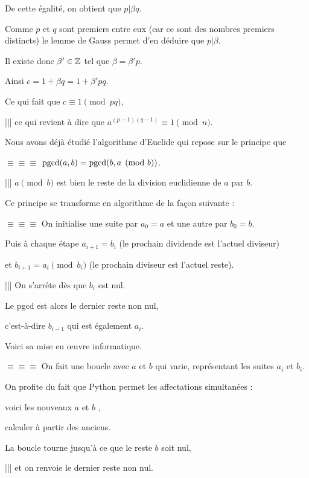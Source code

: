 De cette égalité, on obtient que $p | \beta q$.

\change
Comme $p$ et $q$ sont premiers entre eux (car ce sont des nombres premiers distincts)
le lemme de Gauss permet d'en déduire que $p | \beta$.

\change
Il existe donc $\beta'\in \mathbb{Z}$ tel que $\beta = \beta' p $.

\change
Ainsi $c = 1 + \beta q = 1 + \beta' pq$.

\change
Ce qui fait que $c \equiv 1 \pmod{pq}$,

||| 
ce qui revient à dire que $a^{(p-1)(q-1)} \equiv 1 \pmod n$. 


\diapo

Nous avons déjà étudié l'algorithme d'Euclide qui repose sur le principe
que 

$\equiv \equiv \equiv $
$\mathop{\mathrm{pgcd}}\nolimits(a,b)= \mathop{\mathrm{pgcd}}\nolimits(b, a \pmod{b})$.

|||
$a \pmod{b}$ est  bien le reste de la division euclidienne de $a$ par $b$.

\change


Ce principe se transforme en algorithme de la façon suivante :

$\equiv \equiv \equiv $
On initialise une suite par $a_0=a$ et une autre par $b_0=b$.

Puis à chaque étape 
$a_{i+1}  =  b_i$ (le prochain dividende est l'actuel diviseur)

et 
$b_{i+1}  =  a_i \pmod {b_i}$ (le prochain diviseur est l'actuel reste).

|||
On s'arrête dès que $b_i$ est nul. 

Le pgcd est alors le dernier reste non nul,

c'est-à-dire $b_{i-1}$ qui est également $a_i$.


\change

Voici sa mise en \oe uvre informatique.

$\equiv \equiv \equiv $
On fait une boucle avec $a$ et $b$ qui varie, représentant les suites $a_i$ et $b_i$.

On profite du fait que Python permet les affectations simultanées :

voici les nouveaux $a$ et $b$ ,

calculer à partir des anciens.

La boucle tourne jusqu'à ce que le reste $b$ soit nul,

|||
et on renvoie le dernier reste non nul.




